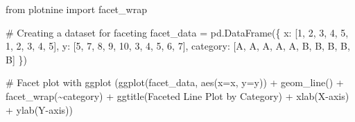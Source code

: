 \documentclass[
  letterpaper,
  DIV=11,
  numbers=noendperiod]{scrreprt}
\newenvironment{Shaded}{\begin{snugshade}}{\end{snugshade}}
\newcommand{\CommentTok}[1]{\textcolor[rgb]{0.37,0.37,0.37}{#1}}
\newcommand{\DecValTok}[1]{\textcolor[rgb]{0.68,0.00,0.00}{#1}}
\newcommand{\ImportTok}[1]{\textcolor[rgb]{0.00,0.46,0.62}{#1}}
\newcommand{\NormalTok}[1]{\textcolor[rgb]{0.00,0.23,0.31}{#1}}
\newcommand{\OperatorTok}[1]{\textcolor[rgb]{0.37,0.37,0.37}{#1}}
\newcommand{\StringTok}[1]{\textcolor[rgb]{0.13,0.47,0.30}{#1}}
\begin{document}
\begin{Shaded}
\begin{Highlighting}[]
\ImportTok{from}\NormalTok{ plotnine }\ImportTok{import}\NormalTok{ facet\_wrap}

\CommentTok{\# Creating a dataset for faceting}
\NormalTok{facet\_data }\OperatorTok{=}\NormalTok{ pd.DataFrame(\{}
    \StringTok{\textquotesingle{}x\textquotesingle{}}\NormalTok{: [}\DecValTok{1}\NormalTok{, }\DecValTok{2}\NormalTok{, }\DecValTok{3}\NormalTok{, }\DecValTok{4}\NormalTok{, }\DecValTok{5}\NormalTok{, }\DecValTok{1}\NormalTok{, }\DecValTok{2}\NormalTok{, }\DecValTok{3}\NormalTok{, }\DecValTok{4}\NormalTok{, }\DecValTok{5}\NormalTok{],}
    \StringTok{\textquotesingle{}y\textquotesingle{}}\NormalTok{: [}\DecValTok{5}\NormalTok{, }\DecValTok{7}\NormalTok{, }\DecValTok{8}\NormalTok{, }\DecValTok{9}\NormalTok{, }\DecValTok{10}\NormalTok{, }\DecValTok{3}\NormalTok{, }\DecValTok{4}\NormalTok{, }\DecValTok{5}\NormalTok{, }\DecValTok{6}\NormalTok{, }\DecValTok{7}\NormalTok{],}
    \StringTok{\textquotesingle{}category\textquotesingle{}}\NormalTok{: [}\StringTok{\textquotesingle{}A\textquotesingle{}}\NormalTok{, }\StringTok{\textquotesingle{}A\textquotesingle{}}\NormalTok{, }\StringTok{\textquotesingle{}A\textquotesingle{}}\NormalTok{, }\StringTok{\textquotesingle{}A\textquotesingle{}}\NormalTok{, }\StringTok{\textquotesingle{}A\textquotesingle{}}\NormalTok{, }\StringTok{\textquotesingle{}B\textquotesingle{}}\NormalTok{, }\StringTok{\textquotesingle{}B\textquotesingle{}}\NormalTok{, }\StringTok{\textquotesingle{}B\textquotesingle{}}\NormalTok{, }\StringTok{\textquotesingle{}B\textquotesingle{}}\NormalTok{, }\StringTok{\textquotesingle{}B\textquotesingle{}}\NormalTok{]}
\NormalTok{\})}

\CommentTok{\# Facet plot with ggplot}
\NormalTok{(ggplot(facet\_data, aes(x}\OperatorTok{=}\StringTok{\textquotesingle{}x\textquotesingle{}}\NormalTok{, y}\OperatorTok{=}\StringTok{\textquotesingle{}y\textquotesingle{}}\NormalTok{)) }\OperatorTok{+}
\NormalTok{ geom\_line() }\OperatorTok{+}
\NormalTok{ facet\_wrap(}\StringTok{\textquotesingle{}\textasciitilde{}category\textquotesingle{}}\NormalTok{) }\OperatorTok{+}
\NormalTok{ ggtitle(}\StringTok{\textquotesingle{}Faceted Line Plot by Category\textquotesingle{}}\NormalTok{) }\OperatorTok{+}
\NormalTok{ xlab(}\StringTok{\textquotesingle{}X{-}axis\textquotesingle{}}\NormalTok{) }\OperatorTok{+}
\NormalTok{ ylab(}\StringTok{\textquotesingle{}Y{-}axis\textquotesingle{}}\NormalTok{))}
\end{Highlighting}
\end{Shaded}
\end{document}
